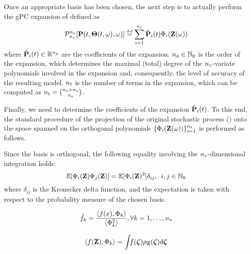 Once an appropriate basis has been chosen, the next step is to actually perform the gPC expansion of  defined as
\begin{equation}
  \mathcal{P}_{{n_v}}^{{n_o}}[\mathbf{P}(t, {\boldsymbol\Theta}(t, \omega), \omega)] \stackrel{\text{\tiny def}}{=} \sum_{i = 1}^{{n_t}} \hat{\mathbf{P}}_i(t) \Phi_i(\mathbf{Z}(\omega))
\end{equation}
where $\hat{\mathbf{P}}_i(t) \in \mathbb{R}^{n_p}$ are the coefficients of the expansion. ${n_o} \in \mathbb{N}_{0}$ is the order of the expansion, which determines the maximal (total) degree of the ${n_v}$-variate polynomials involved in the expansion and, consequently, the level of accuracy of the resulting model. ${n_t}$ is the number of terms in the expansion, which can be computed as ${n_t} = {{n_o} + {n_v} \choose {n_o}}$.

Finally, we need to determine the coefficients of the expansion $\hat{\mathbf{P}}_i(t)$. To this end, the standard procedure of the projection of the original stochastic process () onto the space spanned on the orthogonal polynomials $\{ \Phi_i(\mathbf{Z}(\omega)) \}_{i = 1}^{{n_t}}$ is performed as follows.

Since the basis is orthogonal, the following equality involving the ${n_v}$-dimensional integration holds:
\begin{equation} \elabel{orthogonality}
  \oExp{\pcb_i(\vIRV) \pcb_j(\vIRV)} = \oExp{\pcb_i(\vIRV)^2} \delta_{ij}, \sep i,j \in \natural{0}
\end{equation}
where $\delta_{ij}$ is the Kronecker delta function, and the expectation is taken with respect to the probability measure of the chosen basis.

\begin{equation} \elabel{pc-coefficients}
  \pcc{f}_k = \frac{\innerp{f(x), \pcb_k}}{\innerp{\pcb_k^2}}, \forall k = 1, \dotsc, \pcorder
\end{equation}

\begin{equation} \elabel{pc-integral}
  \innerp{f(\vIRV), \pcb_k} = \int_{} f(\virv) \pdf_\vIRV(\virv) d\virv
\end{equation}
